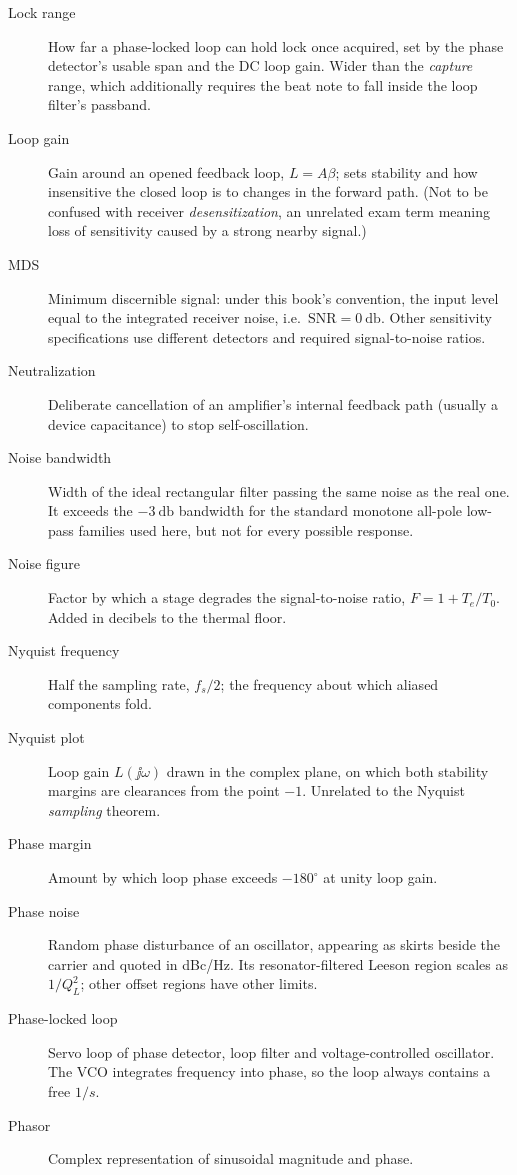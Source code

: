 \begin{description}
\item[Lock range] How far a phase-locked loop can hold lock once acquired, set by the phase detector's usable span and the DC loop gain. Wider than the \emph{capture} range, which additionally requires the beat note to fall inside the loop filter's passband.
\item[Loop gain] Gain around an opened feedback loop, \(L=A\beta\); sets stability and how insensitive the closed loop is to changes in the forward path. (Not to be confused with receiver \emph{desensitization}, an unrelated exam term meaning loss of sensitivity caused by a strong nearby signal.)
\item[MDS] Minimum discernible signal: under this book's convention, the input level equal to the integrated receiver noise, i.e.\ \(\mathrm{SNR}=\SI{0}{\decibel}\). Other sensitivity specifications use different detectors and required signal-to-noise ratios.
\item[Neutralization] Deliberate cancellation of an amplifier's internal feedback path (usually a device capacitance) to stop self-oscillation.
\item[Noise bandwidth] Width of the ideal rectangular filter passing the same noise as the real one. It exceeds the \(-\SI{3}{\decibel}\) bandwidth for the standard monotone all-pole low-pass families used here, but not for every possible response.
\item[Noise figure] Factor by which a stage degrades the signal-to-noise ratio, \(F=1+T_e/T_0\). Added in decibels to the thermal floor.
\item[Nyquist frequency] Half the sampling rate, \(f_s/2\); the frequency about which aliased components fold.
\item[Nyquist plot] Loop gain \(L(\jj\omega)\) drawn in the complex plane, on which both stability margins are clearances from the point \(-1\). Unrelated to the Nyquist \emph{sampling} theorem.
\item[Phase margin] Amount by which loop phase exceeds \(-180^\circ\) at unity loop gain.
\item[Phase noise] Random phase disturbance of an oscillator, appearing as skirts beside the carrier and quoted in dBc/Hz. Its resonator-filtered Leeson region scales as \(1/Q_L^2\); other offset regions have other limits.
\item[Phase-locked loop] Servo loop of phase detector, loop filter and voltage-controlled oscillator. The VCO integrates frequency into phase, so the loop always contains a free \(1/s\).
\item[Phasor] Complex representation of sinusoidal magnitude and phase.

\end{description}
